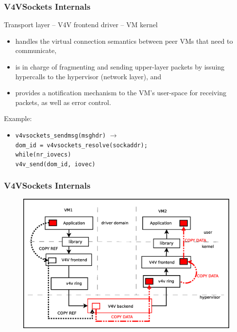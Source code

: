 \documentclass[red,slidestop,notes,compress,mathserif]{beamer}
\begin{document}
\begin{frame}
\frametitle{V4VSockets Internals}
\begin{block}{Transport layer -- V4V frontend driver -- VM kernel}
\begin{itemize}
\item handles the virtual connection semantics between peer VMs that need to communicate,
\item is in charge of fragmenting and sending upper-layer packets by issuing hypercalls to the hypervisor (network layer), and
\item provides a notification mechanism to the VM's user-space for receiving packets, as well as error control.
\end{itemize}
\end{block}
\begin{block}{Example:}
\begin{itemize}
\item \texttt{v4vsockets\_sendmsg(msghdr)} $\rightarrow$ \\\texttt{dom\_id = v4vsockets\_resolve(sockaddr); \\while(nr\_iovecs) \\        v4v\_send(dom\_id, iovec)}
\end{itemize}
\end{block}
\end{frame}

\begin{frame}
\frametitle{V4VSockets Internals}
\begin{figure}
\includegraphics[scale=0.30]{figures/v4vsockets.eps}
\end{figure}
\end{frame}
\end{document}
